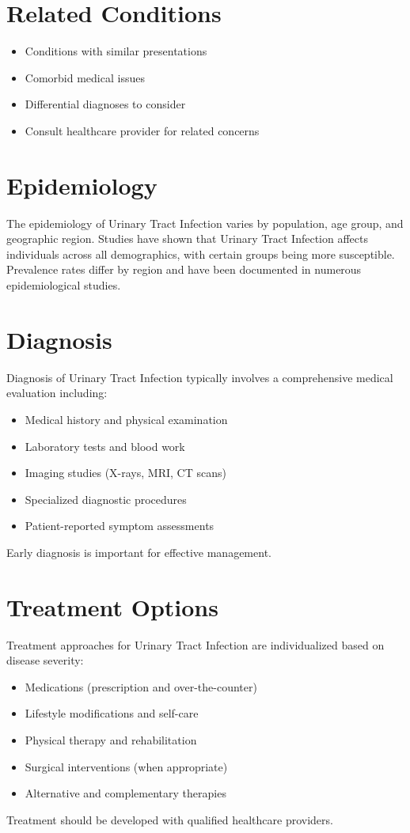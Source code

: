 \section*{Related Conditions}
\begin{itemize}
  \item Conditions with similar presentations
  \item Comorbid medical issues
  \item Differential diagnoses to consider
  \item Consult healthcare provider for related concerns
\end{itemize}

\section*{Epidemiology}
The epidemiology of Urinary Tract Infection varies by population, age group, and geographic region. Studies have shown that Urinary Tract Infection affects individuals across all demographics, with certain groups being more susceptible. Prevalence rates differ by region and have been documented in numerous epidemiological studies.

\section*{Diagnosis}
Diagnosis of Urinary Tract Infection typically involves a comprehensive medical evaluation including:
\begin{itemize}
  \item Medical history and physical examination
  \item Laboratory tests and blood work
  \item Imaging studies (X-rays, MRI, CT scans)
  \item Specialized diagnostic procedures
  \item Patient-reported symptom assessments
\end{itemize}
Early diagnosis is important for effective management.

\section*{Treatment Options}
Treatment approaches for Urinary Tract Infection are individualized based on disease severity:
\begin{itemize}
  \item Medications (prescription and over-the-counter)
  \item Lifestyle modifications and self-care
  \item Physical therapy and rehabilitation
  \item Surgical interventions (when appropriate)
  \item Alternative and complementary therapies
\end{itemize}
Treatment should be developed with qualified healthcare providers.


